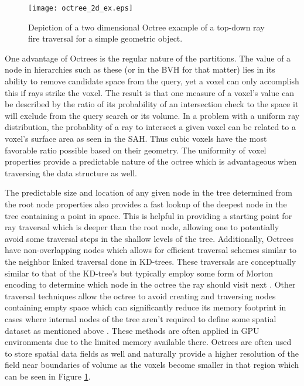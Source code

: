 \begin{figure}[H]
  \centering
  \texttt{[image: octree\_2d\_ex.eps]}
  \caption[A 2D Octree example.]{Depiction of a two dimensional Octree example of a top-down ray fire traversal for a simple geometric object.}
  \label{fig:2D_octree}
\end{figure}

One advantage of Octrees is the regular nature of the partitions. The value of a
node in hierarchies such as these (or in the BVH for that matter) lies in its
ability to remove candidate space from the query, yet a voxel can only
accomplish this if rays strike the voxel. The result is that one measure of a
voxel's value can be described by the ratio of its probability of an
intersection check to the space it will exclude from the query search or its
volume. In a problem with a uniform ray distribution, the probablity of a ray to
intersect a given voxel can be related to a voxel's surface area as seen in the
SAH. Thus cubic voxels have the most favorable ratio possible based on their
geometry. The uniformity of voxel properties provide a predictable nature of the
octree which is advantageous when traversing the data structure as well.

The predictable size and location of any given node in the tree determined from
the root node properties also provides a fast lookup of the deepest node in the
tree containing a point in space. This is helpful in providing a starting point
for ray traversal which is deeper than the root node, allowing one to
potentially avoid some traversal steps in the shallow levels of the
tree. Additionally, Octrees have non-overlapping nodes which allows for
efficient traversal schemes similar to the neighbor linked traversal done in
KD-trees. These traversals are conceptually similar to that of the KD-tree's but
typically employ some form of Morton encoding to determine which node in the
octree the ray should visit next \cite{Revelles_2000}. Other traversal
techniques allow the octree to avoid creating and traversing nodes containing
empty space which can significantly reduce its memory footprint in cases where
internal nodes of the tree aren't required to define some spatial dataset as
mentioned above \cite{Samet_1989}. These methods are often applied in GPU
environments due to the limited memory available there. Octrees are often used
to store spatial data fields as well and naturally provide a higher resolution
of the field near boundaries of volume as the voxels become smaller in that
region which can be seen in Figure \ref{fig:2D_octree}.

